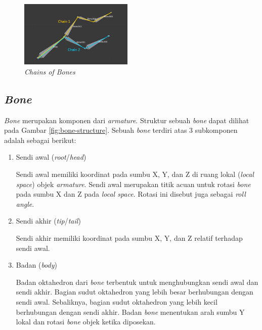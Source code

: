 \begin{figure}[ht]
    \centering
    \includegraphics[width=0.48\textwidth]{resources/chapter-2-chain-of-bones.png}
    \caption{\textit{Chains of Bones} \parencite{blender-manual}}
    \label{fig:chains-of-bones}
\end{figure}

\subsection{\textit{Bone}}

\textit{Bone} merupakan komponen dari \textit{armature}. Struktur sebuah
\textit{bone} dapat dilihat pada Gambar \ref{fig:bone-structure}. Sebuah
\textit{bone} terdiri atas 3 subkomponen adalah sebagai berikut:

\begin{enumerate}

    \item Sendi awal (\textit{root}/\textit{head})

    Sendi awal memiliki koordinat pada sumbu X, Y, dan Z di ruang lokal
    (\textit{local space}) objek \textit{armature}. Sendi awal merupakan titik
    acuan untuk rotasi \textit{bone} pada sumbu X dan Z pada \textit{local
    space}. Rotasi ini disebut juga sebagai \textit{roll angle}.

    \item Sendi akhir (\textit{tip}/\textit{tail})

    Sendi akhir memiliki koordinat pada sumbu X, Y, dan Z relatif terhadap sendi
    awal.

    \item Badan (\textit{body})

    Badan oktahedron dari \textit{bone} terbentuk untuk menghubungkan sendi awal
    dan sendi akhir. Bagian sudut oktahedron yang lebih besar berhubungan dengan
    sendi awal. Sebaliknya, bagian sudut oktahedron yang lebih kecil berhubungan
    dengan sendi akhir. Badan \textit{bone} menentukan arah sumbu Y lokal dan
    rotasi \textit{bone} objek ketika diposekan.

\end{enumerate}

